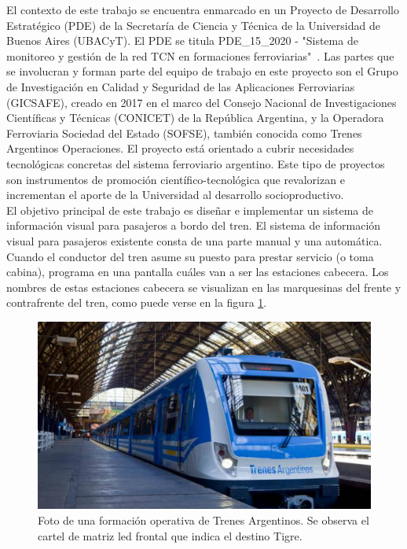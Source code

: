 El  contexto de este trabajo se encuentra enmarcado en un Proyecto de Desarrollo Estratégico (PDE) de la Secretaría de Ciencia y Técnica de la Universidad de Buenos Aires (UBACyT). El PDE se titula PDE\_15\_2020 - "Sistema de monitoreo y gestión de la red TCN en formaciones ferroviarias"\ \citep{PDE-TCN}. Las partes que se involucran y forman parte del equipo de trabajo en este proyecto son el Grupo de Investigación en Calidad y Seguridad de las Aplicaciones Ferroviarias (GICSAFE), creado en 2017 en el marco del Consejo Nacional de Investigaciones Científicas y Técnicas (CONICET) de la República Argentina, y la  Operadora Ferroviaria Sociedad del Estado (SOFSE), también conocida como Trenes Argentinos Operaciones. El proyecto está orientado a cubrir necesidades tecnológicas concretas del sistema ferroviario argentino. Este tipo de proyectos son instrumentos de promoción científico-tecnológica que revalorizan e incrementan el aporte de la Universidad al desarrollo socioproductivo.\\

El objetivo principal de este trabajo es diseñar e implementar un sistema de información visual para pasajeros a bordo del tren. El sistema de información visual para pasajeros existente consta de una parte manual y una automática. Cuando el conductor del tren asume su puesto para prestar servicio (o toma cabina), programa en una pantalla cuáles van a ser las estaciones cabecera. Los nombres de estas estaciones cabecera se visualizan en las marquesinas del frente y contrafrente del tren, como puede verse en la figura \ref{fig:tren}.

\begin{figure}[ht]
	\centering
	\includegraphics[width=1\textwidth]{./Figures/tren.jpg}
	\caption{Foto de una formación operativa de Trenes Argentinos. Se observa el cartel de matriz led frontal que indica el destino Tigre.}
	\label{fig:tren}
\end{figure}


